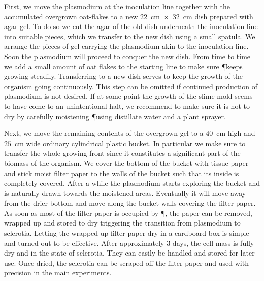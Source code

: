 		First, we move the plasmodium at the inoculation line together with the accumulated overgrown oat-flakes to a new $22$~cm~$\times$~$32$~cm dish prepared with agar gel. To do so we cut the agar of the old dish underneath the inoculation line into suitable pieces, which we transfer to the new dish using a small spatula. We arrange the pieces of gel carrying the plasmodium akin to the inoculation line. Soon the plasmodium will proceed to conquer the new dish. From time to time we add a small amount of oat flakes to the starting line to make sure \P keeps growing steadily. Transferring to a new dish serves to keep the growth of the organism going continuously. This step can be omitted if continued production of plasmodium is not desired. If at some point the growth of the slime mold seems to have come to an unintentional halt, we recommend to make sure it is not to dry by carefully moistening \P using distillate water and a plant sprayer.

		Next, we move the remaining contents of the overgrown gel to a $40$~cm high and $25$~cm wide ordinary cylindrical plastic bucket. In particular we make sure to transfer the whole growing front since it constitutes a significant part of the biomass of the organism. We cover the bottom of the bucket with tissue paper and stick moist filter paper to the walls of the bucket such that its inside is completely covered. After a while the plasmodium starts exploring the bucket and is naturally drawn towards the moistened areas. Eventually it will move away from the drier bottom and move along the bucket walls covering the filter paper. As soon as most of the filter paper is occupied by \P, the paper can be removed, wrapped up and stored to dry triggering the transition from plasmodium to sclerotia. Letting the wrapped up filter paper dry in a cardboard box is simple and turned out to be effective. After approximately $3$ days, the cell mass is fully dry and in the state of sclerotia. They can easily be handled and stored for later use. Once dried, the sclerotia can be scraped off the filter paper and used with precision in the main experiments.